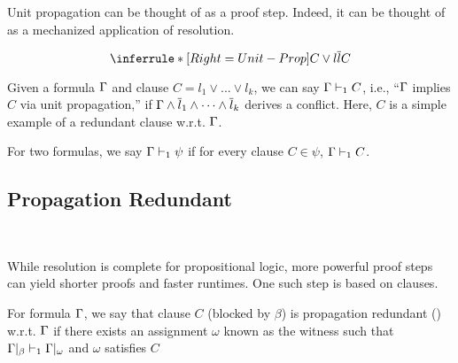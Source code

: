 Unit propagation can be thought of as a proof step. Indeed, it can be thought of as a mechanized application of resolution.

\begin{equation*}
    \inferrule*[Right=Unit-Prop]{
        C \lor l \\ \overline{l}
    }{
        C
    }
\end{equation*}

Given a formula $\Gamma$ and clause $C = l_1 \lor ... \lor l_k$, we can say $\Gamma \vdash_1 C$, i.e., ``$\Gamma$ implies $C$ via unit propagation,'' if $\Gamma \land \overline{l}_1 \land \dots \land \overline{l}_k$ derives a conflict. Here, $C$ is a simple example of a redundant clause w.r.t. $\Gamma$. 








For two formulas, we say $\Gamma \vdash_1 \psi$ if for every clause $C \in \psi$, $\Gamma \vdash_1 C$. 


\subsection{Propagation Redundant}~\label{subsec:pr}

While resolution is complete for propositional logic, more powerful proof steps can yield shorter proofs and faster runtimes. One such step is based on \pr clauses.

\begin{definition}
    For formula $\Gamma$, we say that clause $C$ (blocked by $\beta$) is propagation redundant (\pr) w.r.t. $\Gamma$ if there exists an assignment $\omega$ known as the witness such that $\Gamma|_\beta \vdash_1 \Gamma|_\omega$ and $\omega$ satisfies $C$
\end{definition}


